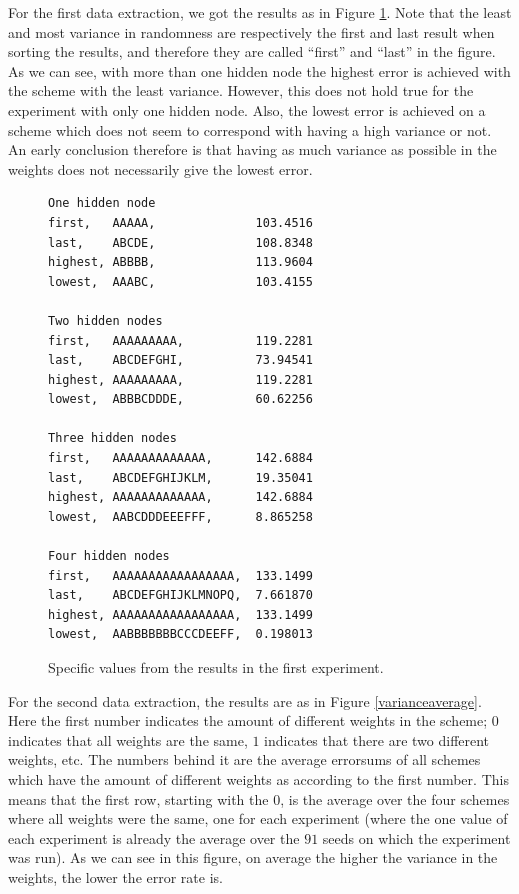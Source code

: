 \documentclass[a4paper, 10pt, notitlepage, twocolumn]{article}
\begin{document}
  For the first data extraction, we got the results as in Figure \ref{firstlast}. Note that the least and most variance in randomness are respectively the first and last result when sorting the results, and therefore they are called ``first'' and ``last'' in the figure. As we can see, with more than one hidden node the highest error is achieved with the scheme with the least variance. However, this does not hold true for the experiment with only one hidden node. Also, the lowest error is achieved on a scheme which does not seem to correspond with having a high variance or not. An early conclusion therefore is that having as much variance as possible in the weights does not necessarily give the lowest error.\\
  
  \begin{figure}[h!]
  	\begin{verbatim}
One hidden node
first,   AAAAA,              103.4516
last,    ABCDE,              108.8348
highest, ABBBB,              113.9604
lowest,  AAABC,              103.4155

Two hidden nodes
first,   AAAAAAAAA,          119.2281
last,    ABCDEFGHI,          73.94541
highest, AAAAAAAAA,          119.2281
lowest,  ABBBCDDDE,          60.62256

Three hidden nodes
first,   AAAAAAAAAAAAA,      142.6884
last,    ABCDEFGHIJKLM,      19.35041
highest, AAAAAAAAAAAAA,      142.6884
lowest,  AABCDDDEEEFFF,      8.865258

Four hidden nodes
first,   AAAAAAAAAAAAAAAAA,  133.1499
last,    ABCDEFGHIJKLMNOPQ,  7.661870
highest, AAAAAAAAAAAAAAAAA,  133.1499
lowest,  AABBBBBBBCCCDEEFF,  0.198013
  	\end{verbatim}
  	\caption{Specific values from the results in the first experiment.}
  	\label{firstlast}
  \end{figure}
  For the second data extraction, the results are as in Figure \ref{varianceaverage}. Here the first number indicates the amount of different weights in the scheme; $0$ indicates that all weights are the same, $1$ indicates that there are two different weights, etc. The numbers behind it are the average errorsums of all schemes which have the amount of different weights as according to the first number. This means that the first row, starting with the $0$, is the average over the four schemes where all weights were the same, one for each experiment (where the one value of each experiment is already the average over the $91$ seeds on which the experiment was run). As we can see in this figure, on average the higher the variance in the weights, the lower the error rate is.
  
\end{document}
